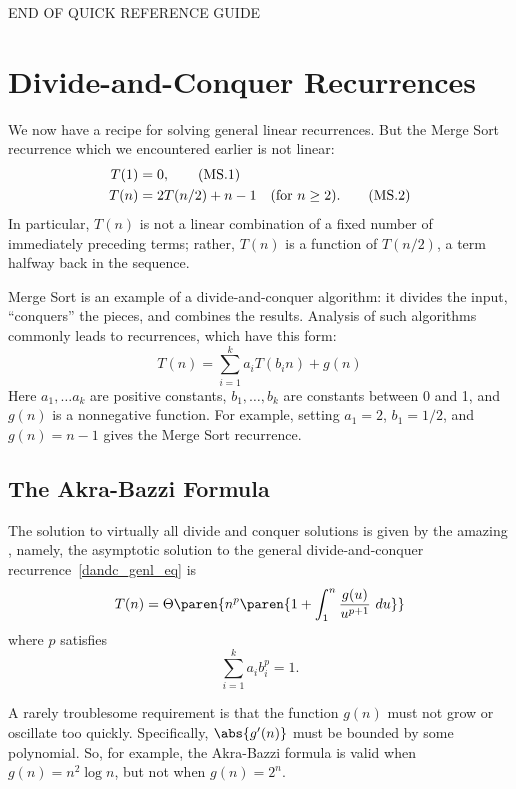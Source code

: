 \begin{center}
END OF QUICK REFERENCE GUIDE
\end{center}

\section{Divide-and-Conquer Recurrences}

We now have a recipe for solving general linear recurrences.  But the
Merge Sort recurrence which we encountered
earlier is not linear:
\begin{align}
T(1) & = 0, \tag{MS.1}\\
T(n) & = 2 T(n/2) + n - 1 & \text{(for $n \geq 2$).\tag{MS.2}}
\end{align}
In particular, $T(n)$ is not a linear combination of a fixed number of
immediately preceding terms; rather, $T(n)$ is a function of $T(n/2)$,
a term halfway back in the sequence.

Merge Sort is an example of a divide-and-conquer algorithm: it divides
the input, ``conquers'' the pieces, and combines the results.
Analysis of such algorithms commonly leads to 
recurrences, which have this form:
\begin{equation}\label{dandc_genl_eq}
T(n) =
 \sum_{i=1}^k a_i T(b_i n) + g(n)
\end{equation}
Here $a_1, \ldots a_k$ are positive constants, $b_1, \ldots, b_k$ are
constants between 0 and 1, and $g(n)$ is a nonnegative function.  For
example, setting $a_1 = 2$, $b_1 = 1/2$, and $g(n) = n - 1$ gives the
Merge Sort recurrence.

\subsection{The Akra-Bazzi Formula}

The solution to virtually all divide and conquer solutions is given by
the amazing , namely,
the asymptotic solution to the general
divide-and-conquer recurrence~\eqref{dandc_genl_eq} is
\[
T(n) = \Theta\paren{n^p \paren{1 + \int_1^n \frac{g(u)}{u^{p+1}}\ du}}
\]
where $p$ satisfies
\[
\sum_{i=1}^k {a_i b_i^p} = 1.
\]

A rarely troublesome requirement is that the function $g(n)$ must not
grow or oscillate too quickly.  Specifically, $\abs{g'(n)}$ must be
bounded by some polynomial.  So, for example, the Akra-Bazzi formula
is valid when $g(n) = n^2 \log n$, but not when $g(n) = 2^n$.


